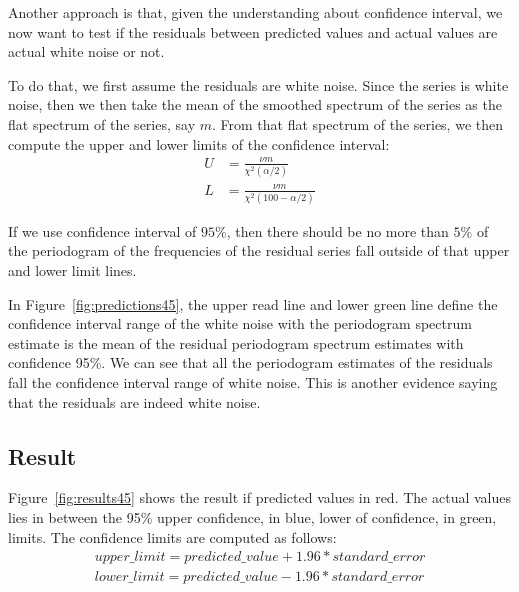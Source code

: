 \documentclass[12pt]{article}
\begin{document}
Another approach is that, given the understanding about confidence interval, we
now want to test if the residuals between predicted values and actual values are
actual white noise or not.

To do that, we first assume the residuals are white noise. Since the series is
white noise, then we then take the mean of the smoothed spectrum of the series
as the flat spectrum of the series, say $m$. From that flat spectrum of the
series, we then compute the upper and lower limits of the confidence interval:
\begin{align}
U &= \frac{\nu m}{\chi^2(\alpha/2)}\\
L &= \frac{\nu m}{\chi^2(100-\alpha/2)}
\end{align}

If we use confidence interval of $95\%$, then there should be no more than $5\%$
of the periodogram of the frequencies of the residual series fall outside of
that upper and lower limit lines.

In Figure~\ref{fig:predictions45}, the upper read line and lower green line
define the confidence interval range of the white noise with the periodogram
spectrum estimate is the mean of the residual periodogram spectrum estimates with
confidence 95\%. We can see that all the periodogram estimates of the residuals
fall the confidence interval range of white noise. This is another evidence
saying that the residuals are indeed white noise.


\subsection{Result}
Figure~\ref{fig:results45} shows the result if predicted values in red. The
actual values lies in between the 95\% upper confidence, in blue, lower of
confidence, in green, limits. The confidence limits are computed as follows:
\begin{align}
upper\_limit = predicted\_value + 1.96*standard\_error\\
lower\_limit = predicted\_value - 1.96*standard\_error
\end{align}
\end{document}
